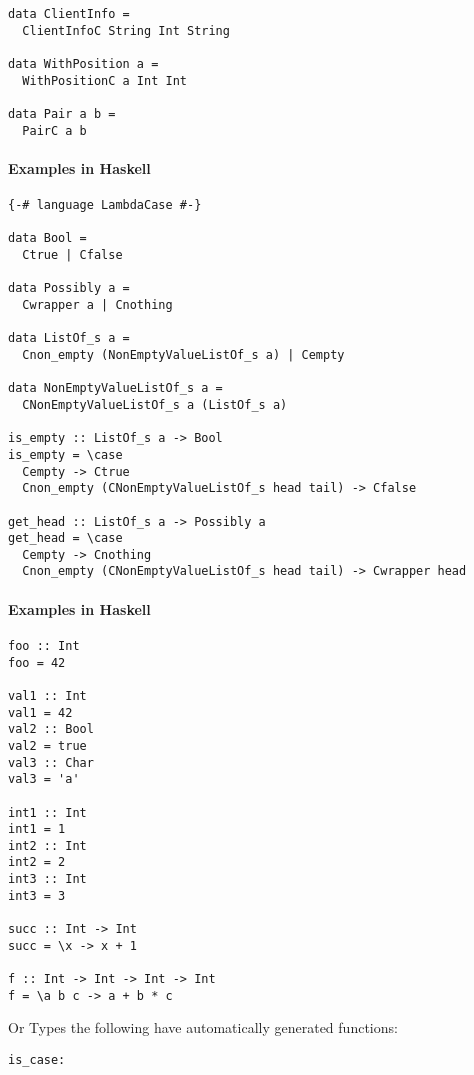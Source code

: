\documentclass{article}
\def\H{Haskell}
\begin{document}
\begin{verbatim}
data ClientInfo =
  ClientInfoC String Int String

data WithPosition a = 
  WithPositionC a Int Int

data Pair a b = 
  PairC a b
\end{verbatim}

\paragraph{Examples in \H}

\begin{verbatim}
{-# language LambdaCase #-}

data Bool =
  Ctrue | Cfalse

data Possibly a =
  Cwrapper a | Cnothing

data ListOf_s a =
  Cnon_empty (NonEmptyValueListOf_s a) | Cempty

data NonEmptyValueListOf_s a =
  CNonEmptyValueListOf_s a (ListOf_s a)

is_empty :: ListOf_s a -> Bool
is_empty = \case
  Cempty -> Ctrue
  Cnon_empty (CNonEmptyValueListOf_s head tail) -> Cfalse

get_head :: ListOf_s a -> Possibly a
get_head = \case
  Cempty -> Cnothing
  Cnon_empty (CNonEmptyValueListOf_s head tail) -> Cwrapper head
\end{verbatim}

\paragraph{Examples in \H}
\begin{verbatim}
foo :: Int
foo = 42

val1 :: Int
val1 = 42
val2 :: Bool
val2 = true
val3 :: Char
val3 = 'a'

int1 :: Int
int1 = 1
int2 :: Int
int2 = 2
int3 :: Int
int3 = 3

succ :: Int -> Int
succ = \x -> x + 1

f :: Int -> Int -> Int -> Int
f = \a b c -> a + b * c
\end{verbatim}

Or Types the following have automatically generated functions:

\begin{verbatim}
is_case:
\end{verbatim}

%
\end{document}
